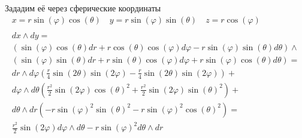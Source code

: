 	Зададим её через сферические координаты
	\begin{gather*}
	x = r \sin(\varphi) \cos(\theta)\quad y = r \sin(\varphi)\sin(\theta)\quad z = r \cos(\varphi)\\
	\\
	dx \wedge dy =\\
	\left(\sin(\varphi)\cos(\theta) dr + r \cos(\theta)\cos(\varphi)d \varphi - r \sin(\varphi)\sin(\theta) d \theta\right) \wedge\\
	\left(\sin(\varphi)\sin(\theta)dr + r \sin(\theta) \cos(\varphi) d \varphi + r \sin(\varphi) \cos(\theta) d \theta\right) =\\
	d r \wedge d \varphi \left(\frac{r}{4} \sin\left(2\theta\right) \sin\left(2\varphi\right) - \frac{r}{4}\sin\left(2\theta\right)\sin\left(2\varphi\right)\right) +\\
	d \varphi \wedge d \theta \left(\frac{r^2}{2} \sin\left(2\varphi\right) \cos(\theta)^2 + \frac{r^2}{2} \sin\left(2 \varphi\right) \sin(\theta)^2\right) +\\
	d \theta \wedge d r \left(-r \sin(\varphi)^2 \sin(\theta)^2 - r \sin(\varphi)^2 \cos(\theta)^2\right) =\\
	\frac{r^2}{2} \sin\left(2\varphi\right) d \varphi \wedge d \theta - r \sin(\varphi)^2 d \theta \wedge d r
	\end{gather*}
